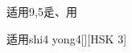 \begin{entry}{适用}{9,5}{⾡、⽤}
  \begin{phonetics}{适用}{shi4 yong4}[][HSK 3]
  \end{phonetics}
\end{entry}
